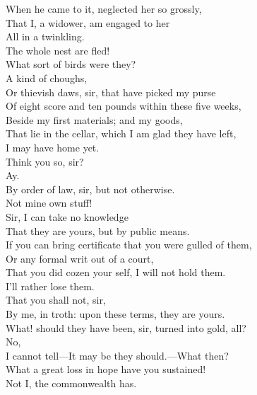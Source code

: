 \documentclass[a4paper,oneside,12pt]{memoir}
\begin{document}
\begin{drama*}
When he came to it, neglected her so grossly,\\
That I, a widower, am engaged to her\\
All in a twinkling.\\
\mammonspeaks {} The whole nest are fled!\\
\lovewitspeaks What sort of birds were they?\\
\mammonspeaks {} A kind of choughs,\\
Or thievish daws, sir, that have picked my purse\\
Of eight score and ten pounds within these five weeks,\\
Beside my first materials; and my goods,\\
That lie in the cellar, which I am glad they have left,\\
I may have home yet.\\
\lovewitspeaks {} Think you so, sir?\\
\mammonspeaks {} Ay.\\
\lovewitspeaks By order of law, sir, but not otherwise.\\
\mammonspeaks Not mine own stuff!\\
\lovewitspeaks {} Sir, I can take no knowledge\\
That they are yours, but by public means.\\
If you can bring certificate that you were gulled of them,\\
Or any formal writ out of a court,\\
That you did cozen your self, I will not hold them.\\
\mammonspeaks I'll rather lose them.\\
\lovewitspeaks {} That you shall not, sir,\\
By me, in troth: upon these terms, they are yours.\\
What! should they have been, sir, turned into gold, all?\\
\mammonspeaks No,\\
I cannot tell---It may be they should.---What then?\\
\lovewitspeaks What a great loss in hope have you sustained!\\
\mammonspeaks Not I, the commonwealth has.\\

\end{drama*}
\end{document}
